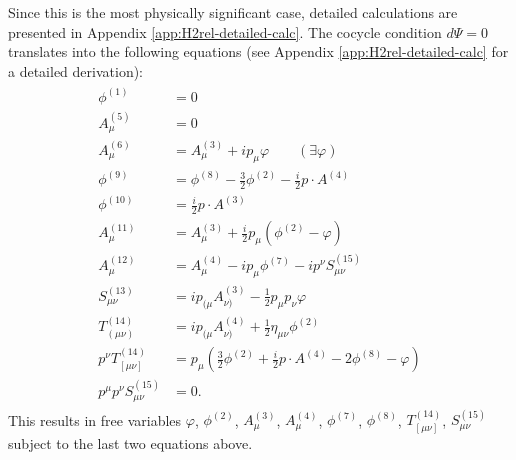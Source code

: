 \documentclass[11pt,reqno,a4paper,final]{amsart}
\theoremstyle{plain}
\theoremstyle{definition}
\newcommand{\1}{\mathbb{1}}
\numberwithin{equation}{section}
\begin{document}
Since this is the most physically significant case, detailed
calculations are presented in Appendix \ref{app:H2rel-detailed-calc}.
The cocycle condition $d\Psi = 0$ translates into the following
equations (see Appendix \ref{app:H2rel-detailed-calc} for a detailed
derivation):
\begin{align} \label{eq:H2rel cocycle conditions}
  \begin{aligned}
    \phi^{(1)} &= 0\\
    A_\mu^{(5)} &= 0\\
    A_\mu^{(6)} &= A_\mu^{(3)} + i p_\mu \varphi\qquad (\exists \varphi)\\
    \phi^{(9)} &= \phi^{(8)} - \tfrac32 \phi^{(2)} - \tfrac{i}2 p \cdot A^{(4)}\\
    \phi^{(10)} &= \tfrac{i}2 p \cdot A^{(3)}\\
    A_\mu^{(11)} &= A_\mu^{(3)} + \tfrac{i}2 p_\mu \left(  \phi^{(2)} -\varphi \right) \\
    A_\mu^{(12)} &= A_\mu^{(4)} - i p_\mu \phi^{(7)} - i p^\nu S_{\mu\nu}^{(15)}\\
    S_{\mu\nu}^{(13)} &= i p_{(\mu} A_{\nu)}^{(3)} - \tfrac12 p_\mu p_\nu \varphi\\
    T_{(\mu\nu)}^{(14)} &= i p_{(\mu} A_{\nu)}^{(4)} + \tfrac12 \eta_{\mu\nu} \phi^{(2)}\\
    p^\nu T_{[\mu\nu]}^{(14)} &= p_\mu \left(\tfrac32 \phi^{(2)} + \tfrac{i}2 p \cdot A^{(4)} - 2 \phi^{(8)} - \varphi \right)\\
    p^\mu p^\nu S_{\mu\nu}^{(15)} &= 0.
  \end{aligned}
\end{align}
This results in free variables $\varphi$, $\phi^{(2)}$, $A_\mu^{(3)}$,
$A_\mu^{(4)}$, $\phi^{(7)}$, $\phi^{(8)}$, $T_{[\mu\nu]}^{(14)}$,
$S_{\mu\nu}^{(15)}$ subject to the last two equations above.
\end{document}
